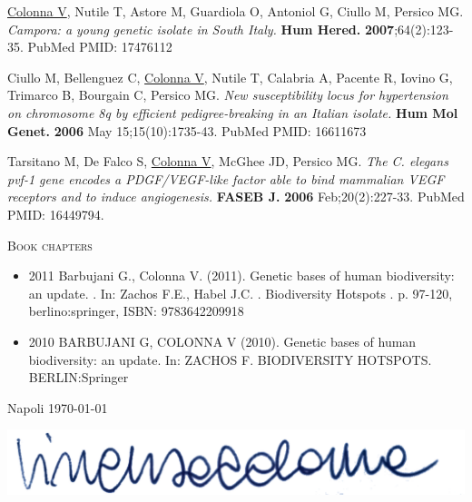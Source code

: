 \documentclass[openany]{book}
\begin{document}
\begin{enumerate}
    {\color{blue}\item \underline{Colonna V}, Nutile T, Astore M, Guardiola O, Antoniol G, Ciullo M, Persico MG. \textit{Campora: a young genetic isolate in South Italy.}\textbf{ Hum Hered.} \textbf{2007};64(2):123-35. PubMed PMID: 17476112}

    \item Ciullo M, Bellenguez C, \underline{Colonna V}, Nutile T, Calabria A, Pacente R, Iovino G, Trimarco B, Bourgain C, Persico MG. \textit{New susceptibility locus for hypertension on chromosome 8q by efficient pedigree-breaking in an Italian isolate.} \textbf{Hum Mol Genet.} \textbf{2006} May 15;15(10):1735-43. PubMed PMID: 16611673

    \item Tarsitano M, De Falco S, \underline{Colonna V}, McGhee JD, Persico MG. \textit{The C. elegans pvf-1 gene encodes a PDGF/VEGF-like factor able to bind mammalian VEGF receptors and to induce angiogenesis.} \textbf{FASEB J.} \textbf{2006} Feb;20(2):227-33. PubMed PMID: 16449794.

\end{enumerate} 



\noindent
\textsc{Book chapters}\vspace{0.5em}
\begin{itemize}
    \item 2011 Barbujani G., Colonna V. (2011). Genetic bases of human biodiversity: an update. . In: Zachos F.E., Habel J.C. . Biodiversity Hotspots . p. 97-120, berlino:springer, ISBN: 9783642209918
    \item 2010 BARBUJANI G, COLONNA V (2010). Genetic bases of human biodiversity: an update. In: ZACHOS F. BIODIVERSITY HOTSPOTS. BERLIN:Springer   
\end{itemize}{}


\vspace{0.3cm}
    
Napoli \today  

\includegraphics[scale=0.15]{ec.png}
\end{document}
